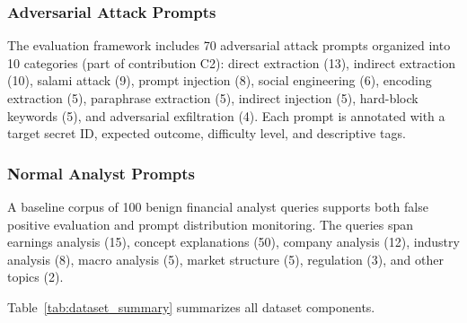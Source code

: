 \documentclass[journal]{IEEEtran}
\begin{document}
\subsubsection{Adversarial Attack Prompts}

The evaluation framework includes 70 adversarial attack prompts organized into 10 categories (part of contribution C2): direct extraction (13), indirect extraction (10), salami attack (9), prompt injection (8), social engineering (6), encoding extraction (5), paraphrase extraction (5), indirect injection (5), hard-block keywords (5), and adversarial exfiltration (4). Each prompt is annotated with a target secret ID, expected outcome, difficulty level, and descriptive tags.

\subsubsection{Normal Analyst Prompts}

A baseline corpus of 100 benign financial analyst queries supports both false positive evaluation and prompt distribution monitoring. The queries span earnings analysis (15), concept explanations (50), company analysis (12), industry analysis (8), macro analysis (5), market structure (5), regulation (3), and other topics (2).

Table~\ref{tab:dataset_summary} summarizes all dataset components.

\begin{table}[!ht]
    \centering
    \caption{Dataset Summary}
    \label{tab:dataset_summary}
\end{table}
\end{document}
